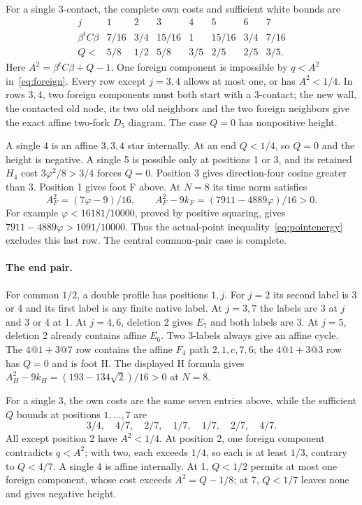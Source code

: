 \documentclass[11pt]{article}
\theoremstyle{remark}
\newcommand{\ph}{\varphi}
\begin{document}
For a single 3-contact, the complete own costs and sufficient
white bounds are
\[
\begin{array}{c|rrrrrrr}
 j&1&2&3&4&5&6&7\\\hline
 \beta^t C\beta&7/16&3/4&15/16&1&15/16&3/4&7/16\\
 Q<&5/8&1/2&5/8&3/5&2/5&2/5&3/5 .
\end{array}
\]
Here $A^2=\beta^t C\beta+Q-1$. One foreign component is
impossible by $q<A^2$ in~\eqref{eq:foreign}. Every row except
$j=3,4$ allows at most one, or has $A^2<1/4$. In rows $3,4$,
two foreign components must both start with a 3-contact; the
new wall, the contacted old node, its two old neighbors and the
two foreign neighbors give the exact affine two-fork $D_5$
diagram. The case $Q=0$ has nonpositive height.

A single 4 is an affine $3,3,4$ star internally. At an end
$Q<1/4$, so $Q=0$ and the height is negative. A single 5 is
possible only at positions 1 or 3, and its retained $H_4$ cost
$3\ph^2/8>3/4$ forces $Q=0$. Position 3 gives direction-four
cosine greater than 3. Position 1 gives foot F above. At $N=8$
its time norm satisfies
\[
 A_F^2=(7\ph-9)/16,\qquad
 A_F^2-9k_F=(7911-4889\ph)/16>0.
\]
For example $\ph<16181/10000$, proved by positive squaring,
gives $7911-4889\ph>1091/10000$. Thus the actual-point
inequality~\eqref{eq:pointenergy} excludes this last row.
The central common-pair case is complete.

\paragraph{The end pair.}
For common $1/2$, a double profile has positions $1,j$.
For $j=2$ its second label is 3 or 4 and its first label is any
finite native label. At $j=3,7$ the labels are $3$ at $j$ and
$3$ or $4$ at 1. At $j=4,6$, deletion 2 gives $E_7$ and
both labels are 3. At $j=5$, deletion 2 already contains affine
$E_6$. Two 3-labels always give an affine cycle. The
$4@1+3@7$ row contains the affine $F_4$ path
$2,1,c,7,6$; the $4@1+3@3$ row has $Q=0$ and is foot H.
The displayed H formula gives
$A_H^2-9k_H=(193-134\sqrt2)/16>0$ at $N=8$.

For a single 3, the own costs are the same seven entries above,
while the sufficient $Q$ bounds at positions $1,\ldots,7$ are
\[
 3/4,\quad4/7,\quad2/7,\quad1/7,\quad1/7,\quad2/7,\quad4/7.
\]
All except position 2 have $A^2<1/4$. At position 2, one foreign
component contradicts $q<A^2$; with two, each exceeds $1/4$,
so each is at least $1/3$, contrary to $Q<4/7$. A single 4 is
affine internally. At 1, $Q<1/2$ permits at most one foreign
component, whose cost exceeds $A^2=Q-1/8$; at 7, $Q<1/7$
leaves none and gives negative height.
\end{document}
